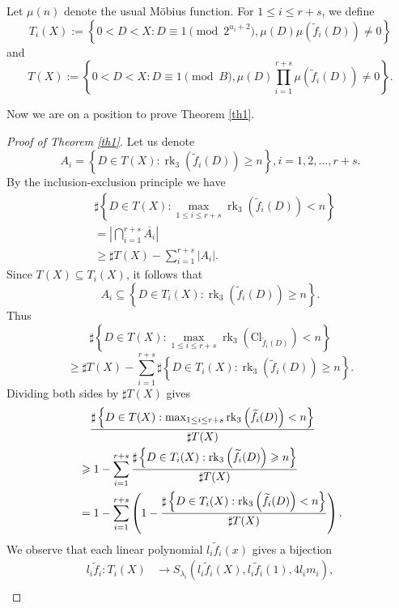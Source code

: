 \documentclass{amsart}
\begin{document}
Let $\mu(n)$ denote  the usual Möbius function.
For $1 \le i \le r+s$, we define
\[
T_{i}(X):=\left\{0<D< X: D\equiv 1\pmod{2^{u_{i}+2}}, \mu(D)\mu\left(\widetilde{f}_{i}(D)\right) \neq 0\right\}
\]
and
\[
T(X):=\left\{0<D< X: D\equiv 1\pmod{ {B}},  \mu(D)\prod_{i=1}^{r+s}\mu\left(\widetilde{f}_{i}(D)\right) \neq 0\right\}.
\]



Now we are on a position to prove Theorem \ref{th1}.

\begin{proof}[Proof of Theorem \ref{th1}]
Let us denote
\[A_i=\left\{D \in T(X): \operatorname{rk}_{3}\left({\widetilde{f}_{i}(D)}\right) \geqslant n\right\}, i=1, 2, \ldots, r+s.\]
By  the inclusion-exclusion principle we have
\[
\begin{aligned}
&\sharp\left\{D \in T(X): \max _{1 \le i \le r+s} \operatorname{rk}_{3}\left({\widetilde{f}_{i}(D)}\right)<n\right\} \\
& =|\bigcap_{i=1}^{r+s}\overline{A_i}| \\
&\ge\sharp T(X) - \sum_{i=1}^{r+s}|A_i|.
\end{aligned}
\]
Since $T(X) \subseteq T_{i}(X)$,  it follows that
\[A_i\subseteq  \left\{D \in T_i(X): \operatorname{rk}_{3}\left({\widetilde{f}_{i}(D)}\right)\ge n\right\}.\]
Thus
\[
\sharp\left\{D \in T(X): \max _{1 \le i \le r+s } \operatorname{rk}_{3}\left(\mathrm{Cl}_{\widetilde{f}_{i}(D)}\right)<n\right\}\]\[\ge\sharp T(X) - \sum_{i=1}^{r+s}
\sharp\left\{D \in T_i(X): \operatorname{rk}_{3}\left({\widetilde{f}_{i}(D)}\right)\ge n\right\}.
\]
Dividing both sides by $\sharp T(X)$ gives
\begin{align}
&\quad \frac{\sharp\left\{D \in T(X): \max _{1 \le i \le r+s} \operatorname{rk}_{3}\left({\widetilde{f}_{i}(D)}\right)<n\right\}}{\sharp T(X)}\notag \\
& \geqslant 1-\sum_{i=1}^{r+s} \frac{\sharp\left\{D \in T_i(X): \operatorname{rk}_{3}\left({\widetilde{f}_{i}(D)}\right) \geqslant n\right\}}{\sharp T(X)}\notag\\
&= 1-\sum_{i=1}^{r+s} \left(1-\frac{\sharp\left\{D \in T_i(X): \operatorname{rk}_{3}\left({\widetilde{f}_{i}(D)}\right) <n\right\}}{\sharp T(X)}\right).
\label{bound}
\end{align}
We observe that each linear polynomial $l_{i} \widetilde{f}_{i}(x)$ gives  a bijection
\[
\begin{aligned}
l_{i} \widetilde{f}_{i}: T_{i}(X) & \longrightarrow   S_{\lambda_i}\left( l_{i}\widetilde{f}_{i}(X) , l_{i} \widetilde{f}_{i}(1), 4 l_{i} m_{i}\right), \\

\end{aligned}\]
\end{proof}
\end{document}
